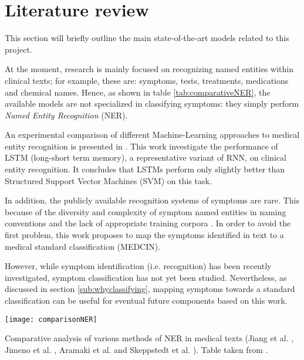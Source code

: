\section{Literature review}
This section will briefly outline the main state-of-the-art models related to this project.

At the moment, research is mainly focused on recognizing named entities within clinical texts; for example, these are: symptoms, tests, treatments, medications and chemical names. Hence, as shown in table \ref{tab:comparativeNER}, the available models are not specialized in classifying symptoms: they simply perform \textit{Named Entity Recognition} (NER).

An experimental comparison of different Machine-Learning approaches to medical entity recognition is presented in \cite{liu2017}. This work investigate the performance of LSTM (long-short term memory), a representative variant of RNN, on clinical entity recognition. It concludes that LSTMs perform only slightly better than Structured Support Vector Machines (SVM) on this task.

In addition, the publicly available recognition systems of symptoms are rare. This because of the diversity and complexity of symptom named entities in naming conventions and the lack of appropriate training corpora \cite{wei2016disease}. In order to avoid the first problem, this work proposes to map the symptoms identified in text to a medical standard classification (MEDCIN).
 
However, while symptom identification (i.e. recognition) has been recently investigated, symptom classification has not yet been studied. Nevertheless, as discussed in section \ref{sub:whyclassifying}, mapping symptoms towards a standard classification can be useful for eventual future components based on this work.

\hspace*{2in}
\begin{table}[h]
  \centering
  \texttt{[image: comparisonNER]}
  \caption{Comparative analysis of various methods of NER in medical texts (Jiang et al. \cite{jiang2011}, Jimeno et al. \cite{jimeno2008}, Aramaki et al. \cite{aramaki2009} and Skeppstedt et al. \cite{skeppstedt2014}). Table taken from \cite{NERoverEHR}.}
  \label{tab:comparativeNER}
\end{table}
